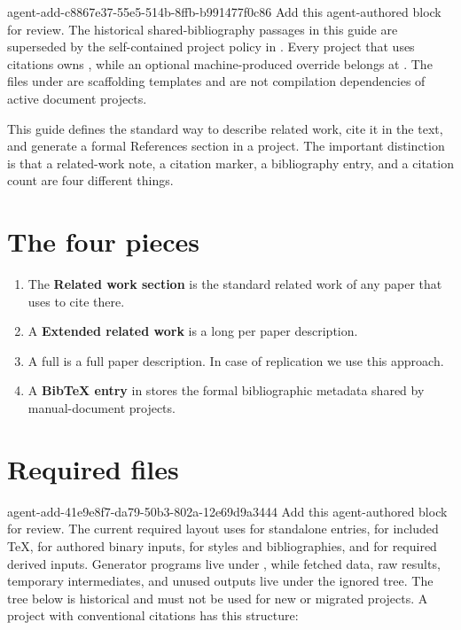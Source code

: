 
\label{doc:related-work}

\agentProposedEdit
  {agent-add-c8867e37-55e5-514b-8ffb-b991477f0c86}
  {Add this agent-authored block for review.}
  {}
  {The historical shared-bibliography passages in this guide are superseded by the self-contained project policy in .
Every project that uses citations owns , while an optional machine-produced override belongs at .
The files under  are scaffolding templates and are not compilation dependencies of active document projects.}

This guide defines the standard way to describe related work, cite it in the text, and generate a formal References section in a  project.
The important distinction is that a related-work note, a citation marker, a bibliography entry, and a citation count are four different things.

\section*{The four pieces}

\begin{enumerate}
  \item The \textbf{Related work section} is the standard related work of any paper that uses \code{\citep} to cite there.
  \item A \textbf{Extended related work} is a long per paper description. 
  \item A full  is a full paper description. 
  In case of replication we use this approach.
  \item A \textbf{BibTeX entry} in  stores the formal bibliographic metadata shared by manual-document projects.
\end{enumerate}

\section*{Required files}

\agentProposedEdit
  {agent-add-41e9e8f7-da79-50b3-802a-12e69d9a3444}
  {Add this agent-authored block for review.}
  {}
  {The current required layout uses  for standalone entries,  for included TeX,  for authored binary inputs,  for styles and bibliographies, and  for required derived inputs.
Generator programs live under , while fetched data, raw results, temporary intermediates, and unused outputs live under the ignored  tree.
The tree below is historical and must not be used for new or migrated projects.}
A project with conventional citations has this structure:

